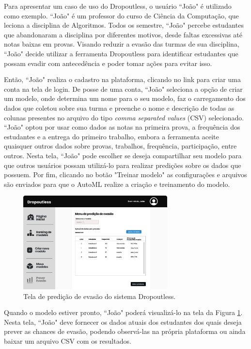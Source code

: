 \documentclass[12pt]{article}
\begin{document}
Para apresentar um caso de uso do Dropoutless, o usuário ``João" é utilizado como exemplo. ``João" é um professor do curso de Ciência da Computação, que leciona a disciplina de Algoritmos. Todos os semestre, ``João" percebe estudantes que abandonaram a disciplina por diferentes motivos, desde faltas excessivas até notas baixas em provas. Visando reduzir a evasão das turmas de sua disciplina, ``João" decide utilizar a ferramenta Dropoutless para identificar estudantes que possam evadir com antecedência e poder tomar ações para evitar isso.

Então, ``João" realiza o cadastro na plataforma, clicando no link para criar uma conta na tela de login. De posse de uma conta, ``João" seleciona a opção de criar um modelo, onde determina um nome para o seu modelo, faz o carregamento dos dados que coletou sobre sua turma e preenche o nome e descrição de todas as colunas presentes no arquivo do tipo \textit{comma separated values} (CSV) selecionado. ``João" optou por usar como dados as notas na primeira prova, a frequência dos estudantes e a entrega do primeiro trabalho, embora a ferramenta aceite quaisquer outros dados sobre provas, trabalhos, frequência, participação, entre outros. Nesta tela, ``João" pode escolher se deseja compartilhar seu modelo para que outros usuários possam utilizá-lo para realizar predições sobre os dados que possuem. Por fim, clicando no botão "Treinar modelo" as configurações e arquivos são enviados para que o AutoML realize a criação e treinamento do modelo.

\begin{figure}
\centering
\includegraphics[width=0.7\textwidth]{images/prever.png}
\caption{Tela de predição de evasão do sistema Dropoutless.}
\label{fig:prever}
\end{figure}

Quando o modelo estiver pronto, ``João" poderá visualizá-lo na tela da Figura \ref{fig:prever}. Nesta tela, ``João" deve fornecer os dados atuais dos estudantes dos quais deseja prever as chances de evasão, podendo observá-las na própria plataforma ou ainda baixar um arquivo CSV com os resultados.
\end{document}

